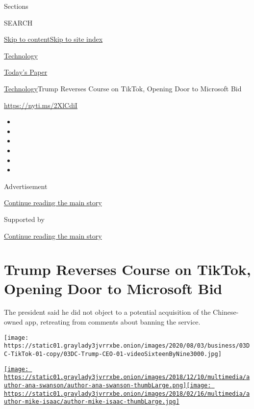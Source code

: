 Sections

SEARCH

\protect\hyperlink{site-content}{Skip to
content}\protect\hyperlink{site-index}{Skip to site index}

\href{https://www.nytimes3xbfgragh.onion/section/technology}{Technology}

\href{https://myaccount.nytimes3xbfgragh.onion/auth/login?response_type=cookie\&client_id=vi}{}

\href{https://www.nytimes3xbfgragh.onion/section/todayspaper}{Today's
Paper}

\href{/section/technology}{Technology}\textbar{}Trump Reverses Course on
TikTok, Opening Door to Microsoft Bid

\url{https://nyti.ms/2XlCdiI}

\begin{itemize}
\item
\item
\item
\item
\item
\item
\end{itemize}

Advertisement

\protect\hyperlink{after-top}{Continue reading the main story}

Supported by

\protect\hyperlink{after-sponsor}{Continue reading the main story}

\hypertarget{trump-reverses-course-on-tiktok-opening-door-to-microsoft-bid}{%
\section{Trump Reverses Course on TikTok, Opening Door to Microsoft
Bid}\label{trump-reverses-course-on-tiktok-opening-door-to-microsoft-bid}}

The president said he did not object to a potential acquisition of the
Chinese-owned app, retreating from comments about banning the service.

\texttt{[image: https://static01.graylady3jvrrxbe.onion/images/2020/08/03/business/03DC-TikTok-01-copy/03DC-Trump-CEO-01-videoSixteenByNine3000.jpg]}

\href{https://www.nytimes3xbfgragh.onion/by/ana-swanson}{\texttt{[image: https://static01.graylady3jvrrxbe.onion/images/2018/12/10/multimedia/author-ana-swanson/author-ana-swanson-thumbLarge.png]}}\href{https://www.nytimes3xbfgragh.onion/by/mike-isaac}{\texttt{[image: https://static01.graylady3jvrrxbe.onion/images/2018/02/16/multimedia/author-mike-isaac/author-mike-isaac-thumbLarge.jpg]}}

